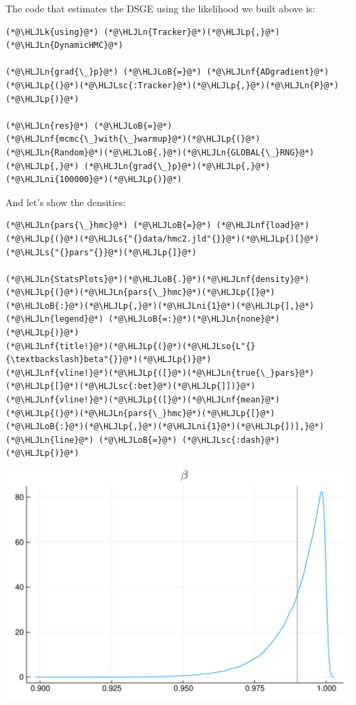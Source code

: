 \documentclass[12pt,a4paper]{article}
\newcommand{\HLJLk}[1]{\textcolor[RGB]{148,91,176}{\textbf{#1}}}
\newcommand{\HLJLn}[1]{#1}
\newcommand{\HLJLnf}[1]{\textcolor[RGB]{66,102,213}{#1}}
\newcommand{\HLJLs}[1]{\textcolor[RGB]{201,61,57}{#1}}
\newcommand{\HLJLsc}[1]{\textcolor[RGB]{201,61,57}{#1}}
\newcommand{\HLJLso}[1]{\textcolor[RGB]{201,61,57}{#1}}
\newcommand{\HLJLni}[1]{\textcolor[RGB]{59,151,46}{#1}}
\newcommand{\HLJLoB}[1]{\textcolor[RGB]{102,102,102}{\textbf{#1}}}
\newcommand{\HLJLp}[1]{#1}
\begin{document}
The code that estimates the DSGE using the likelihood we built above is:



\begin{lstlisting}
(*@\HLJLk{using}@*) (*@\HLJLn{Tracker}@*)(*@\HLJLp{,}@*) (*@\HLJLn{DynamicHMC}@*)

(*@\HLJLn{grad{\_}p}@*) (*@\HLJLoB{=}@*) (*@\HLJLnf{ADgradient}@*)(*@\HLJLp{(}@*)(*@\HLJLsc{:Tracker}@*)(*@\HLJLp{,}@*)(*@\HLJLn{P}@*)(*@\HLJLp{)}@*)

(*@\HLJLn{res}@*) (*@\HLJLoB{=}@*) (*@\HLJLnf{mcmc{\_}with{\_}warmup}@*)(*@\HLJLp{(}@*)(*@\HLJLn{Random}@*)(*@\HLJLoB{.}@*)(*@\HLJLn{GLOBAL{\_}RNG}@*)(*@\HLJLp{,}@*) (*@\HLJLn{grad{\_}p}@*)(*@\HLJLp{,}@*)(*@\HLJLni{100000}@*)(*@\HLJLp{)}@*)
\end{lstlisting}

And let's show the densities:


\begin{lstlisting}
(*@\HLJLn{pars{\_}hmc}@*) (*@\HLJLoB{=}@*) (*@\HLJLnf{load}@*)(*@\HLJLp{(}@*)(*@\HLJLs{"{}data/hmc2.jld"{}}@*)(*@\HLJLp{)[}@*)(*@\HLJLs{"{}pars"{}}@*)(*@\HLJLp{]}@*)

(*@\HLJLn{StatsPlots}@*)(*@\HLJLoB{.}@*)(*@\HLJLnf{density}@*)(*@\HLJLp{(}@*)(*@\HLJLn{pars{\_}hmc}@*)(*@\HLJLp{[}@*)(*@\HLJLoB{:}@*)(*@\HLJLp{,}@*)(*@\HLJLni{1}@*)(*@\HLJLp{],}@*) (*@\HLJLn{legend}@*) (*@\HLJLoB{=:}@*)(*@\HLJLn{none}@*)(*@\HLJLp{)}@*)
(*@\HLJLnf{title!}@*)(*@\HLJLp{(}@*)(*@\HLJLso{L"{}{\textbackslash}beta"{}}@*)(*@\HLJLp{)}@*)
(*@\HLJLnf{vline!}@*)(*@\HLJLp{([}@*)(*@\HLJLn{true{\_}pars}@*)(*@\HLJLp{[}@*)(*@\HLJLsc{:bet}@*)(*@\HLJLp{]])}@*)
(*@\HLJLnf{vline!}@*)(*@\HLJLp{([}@*)(*@\HLJLnf{mean}@*)(*@\HLJLp{(}@*)(*@\HLJLn{pars{\_}hmc}@*)(*@\HLJLp{[}@*)(*@\HLJLoB{:}@*)(*@\HLJLp{,}@*)(*@\HLJLni{1}@*)(*@\HLJLp{])],}@*) (*@\HLJLn{line}@*) (*@\HLJLoB{=}@*) (*@\HLJLsc{:dash}@*)(*@\HLJLp{)}@*)
\end{lstlisting}

\includegraphics[width=\linewidth]{figures/dsge_and_julia_35_1.pdf}
\end{document}
